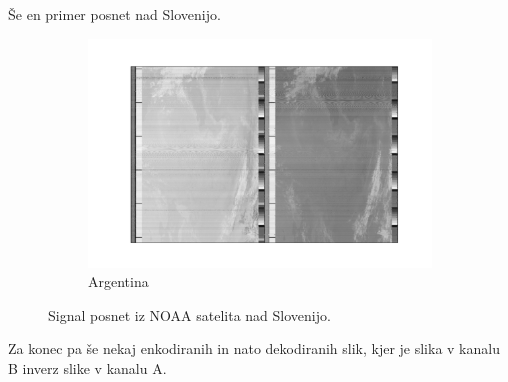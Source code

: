 \documentclass{article}
\begin{document}
Še en primer posnet nad Slovenijo.
\begin{figure}[H]
    \centering
    \begin{subfigure}[b]{0.8\textwidth}
        \centering
        \includegraphics[width=\textwidth]{slovenia.pdf}
        \caption{Argentina}
    \end{subfigure}
	\caption{Signal posnet iz NOAA satelita nad Slovenijo.}
    \label{fig:out_example}
\end{figure}
\newpage
Za konec pa še nekaj enkodiranih in nato dekodiranih slik, kjer je slika v kanalu B inverz slike v kanalu A. 
\end{document}
